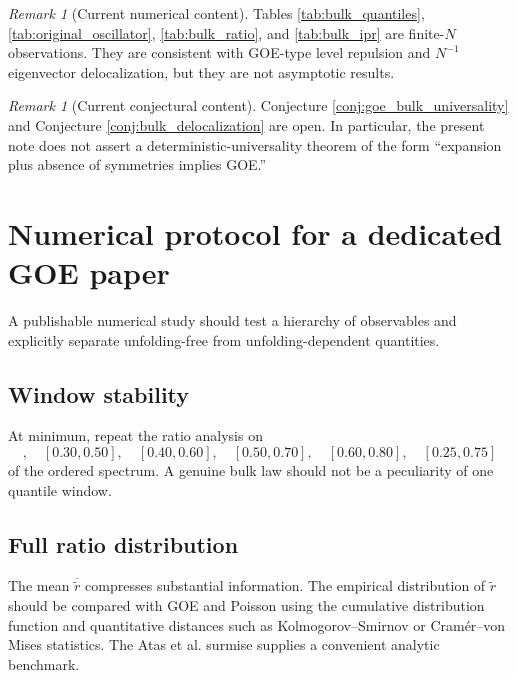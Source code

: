 \documentclass[11pt]{amsart}
\numberwithin{equation}{section}
\theoremstyle{plain}
\theoremstyle{definition}
\theoremstyle{remark}
\newtheorem{remark}[theorem]{Remark}
\begin{document}
\begin{remark}[Current numerical content]
\label{rem:current_numerical_content}
Tables \ref{tab:bulk_quantiles}, \ref{tab:original_oscillator}, \ref{tab:bulk_ratio}, and \ref{tab:bulk_ipr} are finite-$N$ observations.  They are consistent with GOE-type level repulsion and $N^{-1}$ eigenvector delocalization, but they are not asymptotic results.
\end{remark}

\begin{remark}[Current conjectural content]
\label{rem:current_conjectural_content}
Conjecture \ref{conj:goe_bulk_universality} and Conjecture \ref{conj:bulk_delocalization} are open.  In particular, the present note does not assert a deterministic-universality theorem of the form ``expansion plus absence of symmetries implies GOE.''
\end{remark}

\section{Numerical protocol for a dedicated GOE paper}
\label{sec:numerical_protocol}

A publishable numerical study should test a hierarchy of observables and explicitly separate unfolding-free from unfolding-dependent quantities.

\subsection{Window stability}
\label{subsec:window_stability}

At minimum, repeat the ratio analysis on
\begin{equation}
[0.20,0.40],\quad
[0.30,0.50],\quad
[0.40,0.60],\quad
[0.50,0.70],\quad
[0.60,0.80],\quad
[0.25,0.75]
\label{eq:recommended_windows}
\end{equation}
of the ordered spectrum.  A genuine bulk law should not be a peculiarity of one quantile window.

\subsection{Full ratio distribution}
\label{subsec:full_ratio_distribution}

The mean $\overline{\widetilde r}$ compresses substantial information.  The empirical distribution of $\widetilde r$ should be compared with GOE and Poisson using the cumulative distribution function and quantitative distances such as Kolmogorov--Smirnov or Cram\'er--von Mises statistics.  The Atas et al. surmise \cite{Atas2013} supplies a convenient analytic benchmark.
\end{document}
